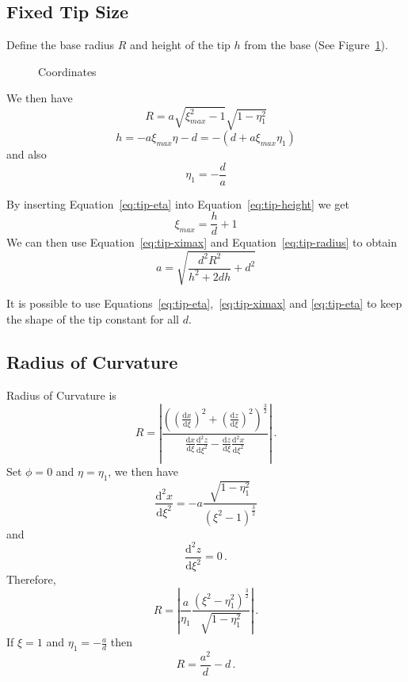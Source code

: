 \documentclass[a4paper,10pt]{article}
\numberwithin{equation}{section}
\newcommand{\ud}{\mathrm{d}}
\begin{document}
\subsection{Fixed Tip Size}
  Define the base radius \(R\) and height of the tip \(h\) from the base (See Figure~\ref{fig:coords_Rh}).
  \begin{figure}
    \centering
    
    \caption{Coordinates}
    \label{fig:coords_Rh}
  \end{figure}
  We then have
  \begin{equation}\label{eq:tip-radius}
    R = a \sqrt{\xi_{max}^2-1}\sqrt{1-\eta_1^2}
  \end{equation}
  \begin{equation}\label{eq:tip-height}
    h = -a\xi_{max}\eta - d = -\left( d + a\xi_{max}\eta_1 \right)
  \end{equation}
  and also
  \begin{equation}\label{eq:tip-eta}
    \eta_1 = -\frac{d}{a}
  \end{equation}

  By inserting Equation~\eqref{eq:tip-eta} into Equation~\eqref{eq:tip-height} we get
  \begin{equation}\label{eq:tip-ximax}
    \xi_{max} = \frac{h}{d} + 1
  \end{equation}
  We can then use Equation~\eqref{eq:tip-ximax} and Equation~\eqref{eq:tip-radius} to obtain
  \begin{equation}\label{eq:tip-a}
    a = \sqrt{\frac{d^2R^2}{h^2 + 2dh} + d^2}
  \end{equation}

  It is possible to use Equations~\eqref{eq:tip-eta},~\eqref{eq:tip-ximax} and \eqref{eq:tip-eta} to keep
  the shape of the tip constant for all \(d\).
%
\subsection{Radius of Curvature}
  Radius of Curvature is
  \begin{equation}
    R = \left| \frac{\left( \left(\frac{\ud x}{\ud \xi}\right)^2 + \left(\frac{\ud z}{\ud \xi}\right)^2 \right)^{\frac{3}{2}}}{\frac{\ud x}{\ud \xi} \frac{\ud^2 z}{\ud \xi^2} - \frac{\ud z}{\ud \xi} \frac{\ud^2 x}{\ud \xi^2}} \right| \, .
  \end{equation}
  Set \(\phi = 0\) and \(\eta = \eta_1\), we then have
  \begin{equation}
    \frac{\ud^2 x}{\ud \xi^2} = - a \frac{\sqrt{1-\eta_1^2}}{(\xi^2-1)^{\frac{3}{2}}}
  \end{equation}
  and
  \begin{equation}
    \frac{\ud^2 z}{\ud \xi^2} = 0\, .
  \end{equation}
  Therefore,
  \begin{equation}
    R = \left| \frac{a}{\eta_1} \frac{(\xi^2 - \eta_1^2)^{\frac{3}{2}}}{\sqrt{1-\eta_1^2}} \right| \, .
  \end{equation}
  If \(\xi = 1\) and \(\eta_1 = -\frac{a}{d}\) then
  \begin{equation}
    R = \frac{a^2}{d} - d\, .
  \end{equation}
%
\end{document}
